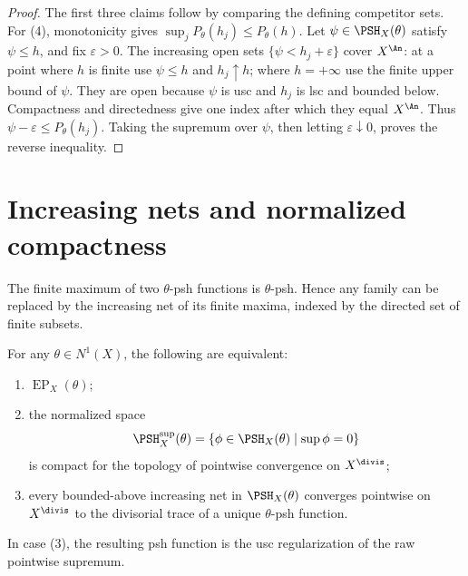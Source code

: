 \begin{proof}
The first three claims follow by comparing the defining competitor sets.
For (4), monotonicity gives
$\sup_jP_\theta(h_j)\leq P_\theta(h)$.  Let
$\psi\in\PSH_X(\theta)$ satisfy $\psi\leq h$, and fix
$\varepsilon>0$.  The increasing open sets $\{\psi<h_j+\varepsilon\}$ cover $X^{\An}$:
at a point where $h$ is finite use $\psi\leq h$ and $h_j\uparrow h$;
where $h=+\infty$ use the finite upper bound of $\psi$. They are open
because $\psi$ is usc and $h_j$ is lsc and bounded below. Compactness
and directedness give one index after which they equal $X^{\An}$.
Thus $\psi-\varepsilon\leq P_\theta(h_j)$.  Taking the supremum over
$\psi$, then letting $\varepsilon\downarrow0$, proves the reverse
inequality.
\end{proof}

\section{Increasing nets and normalized compactness}

The finite maximum of two $\theta$-psh functions is $\theta$-psh.
Hence any family can be replaced by the increasing net of its finite maxima,
indexed by the directed set of finite subsets.

\begin{theorem}\label{thm:bj-envelope-equivalences}
For any $\theta\in N^1(X)$, the following are equivalent:
\begin{enumerate}
\item $\operatorname{EP}_X(\theta)$;
\item the normalized space
\[
 \PSH_X^{\sup}(\theta)
   =\{\phi\in\PSH_X(\theta)\mid\sup\phi=0\}
\]
is compact for the topology of pointwise convergence on
$X^{\divis}$;
\item every bounded-above increasing net in $\PSH_X(\theta)$ converges
      pointwise on $X^{\divis}$ to the divisorial trace of a unique
      $\theta$-psh function.
\end{enumerate}
In case (3), the resulting psh function is the usc regularization of the raw
pointwise supremum.
\end{theorem}

